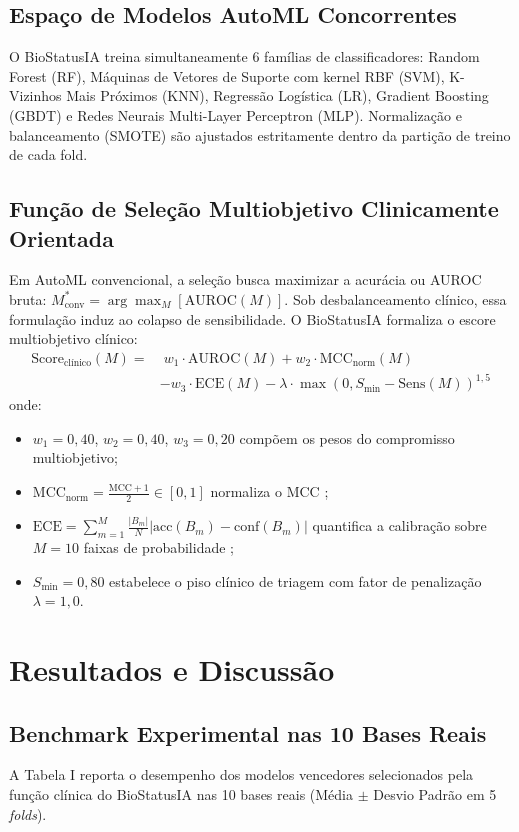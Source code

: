 \documentclass[conference]{IEEEtran}
\begin{document}
\subsection{Espaço de Modelos AutoML Concorrentes}
O BioStatusIA treina simultaneamente 6 famílias de classificadores: Random Forest (RF), Máquinas de Vetores de Suporte com kernel RBF (SVM), K-Vizinhos Mais Próximos (KNN), Regressão Logística (LR), Gradient Boosting (GBDT) e Redes Neurais Multi-Layer Perceptron (MLP). Normalização e balanceamento (SMOTE) são ajustados estritamente dentro da partição de treino de cada fold.

\subsection{Função de Seleção Multiobjetivo Clinicamente Orientada}
Em AutoML convencional, a seleção busca maximizar a acurácia ou AUROC bruta: $M^*_{\text{conv}} = \arg\max_{M} [ \text{AUROC}(M) ]$. Sob desbalanceamento clínico, essa formulação induz ao colapso de sensibilidade. O BioStatusIA formaliza o escore multiobjetivo clínico:
\begin{align}
\text{Score}_{\text{clínico}}(M) = & \; w_1 \cdot \text{AUROC}(M) + w_2 \cdot \text{MCC}_{\text{norm}}(M) \nonumber \\
& - w_3 \cdot \text{ECE}(M) - \lambda \cdot \max\left(0, S_{\min} - \text{Sens}(M)\right)^{1{,}5}
\end{align}
onde:
\begin{itemize}
    \item $w_1 = 0{,}40$, $w_2 = 0{,}40$, $w_3 = 0{,}20$ compõem os pesos do compromisso multiobjetivo;
    \item $\text{MCC}_{\text{norm}} = \frac{\text{MCC} + 1}{2} \in [0, 1]$ normaliza o MCC \cite{mcc1975};
    \item $\text{ECE} = \sum_{m=1}^{M} \frac{|B_m|}{N} |\text{acc}(B_m) - \text{conf}(B_m)|$ quantifica a calibração sobre $M=10$ faixas de probabilidade \cite{guo2017calibration};
    \item $S_{\min} = 0{,}80$ estabelece o piso clínico de triagem com fator de penalização $\lambda = 1{,}0$.
\end{itemize}

\section{Resultados e Discussão}

\subsection{Benchmark Experimental nas 10 Bases Reais}
A Tabela I reporta o desempenho dos modelos vencedores selecionados pela função clínica do BioStatusIA nas 10 bases reais (Média $\pm$ Desvio Padrão em 5 \textit{folds}).
\end{document}
